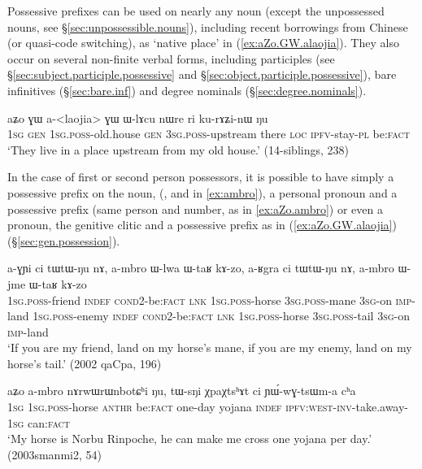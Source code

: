 Possessive prefixes can be used on nearly any noun (except the unpossessed nouns, see §\ref{sec:unpossessible.nouns}), including recent borrowings from Chinese (or quasi-code switching), as   `native place' in (\ref{ex:aZo.GW.alaojia}). They also occur on several non-finite verbal forms, including participles (see §\ref{sec:subject.participle.possessive} and §\ref{sec:object.participle.possessive}), bare infinitives (§\ref{sec:bare.inf}) and degree nominals (§\ref{sec:degree.nominals}).

\begin{exe}
\ex \label{ex:aZo.GW.alaojia}
\gll aʑo ɣɯ a-<laojia> ɣɯ ɯ-lɤcu nɯre ri ku-rɤʑi-nɯ ŋu \\
\textsc{1sg} \textsc{gen} \textsc{1sg}.\textsc{poss}-old.house \textsc{gen} \textsc{3sg}.\textsc{poss}-upstream there \textsc{loc} \textsc{ipfv}-stay-\textsc{pl} be:\textsc{fact} \\
\glt `They live in a place upstream from my old house.' (14-siblings, 238)
\end{exe}

In the case of first or second person possessors, it is possible to have simply a possessive prefix on the noun, (,  and  in \ref{ex:ambro}), a personal pronoun and a possessive prefix (same person and number, as in \ref{ex:aZo.ambro}) or even a pronoun, the genitive clitic  and a possessive prefix as in (\ref{ex:aZo.GW.alaojia}) (§\ref{sec:gen.possession}).

 \begin{exe}
\ex \label{ex:ambro} 
\gll a-ɣɲi ci tɯ\redp{}tɯ-ŋu nɤ, a-mbro ɯ-lwa ɯ-taʁ kɤ-zo, a-ʁgra ci tɯ\redp{}tɯ-ŋu nɤ, a-mbro ɯ-jme ɯ-taʁ kɤ-zo \\
\textsc{1sg}.\textsc{poss}-friend \textsc{indef} \textsc{cond}\redp{}2-be:\textsc{fact} \textsc{lnk} \textsc{1sg}.\textsc{poss}-horse \textsc{3sg}.\textsc{poss}-mane \textsc{3sg}-on \textsc{imp}-land \textsc{1sg}.\textsc{poss}-enemy \textsc{indef} \textsc{cond}\redp{}2-be:\textsc{fact} \textsc{lnk} \textsc{1sg}.\textsc{poss}-horse \textsc{3sg}.\textsc{poss}-tail  \textsc{3sg}-on \textsc{imp}-land  \\
\glt `If you are my friend, land on my horse's mane, if you are my enemy, land on my horse's tail.' (2002 qaCpa, 196)
\end{exe}

\begin{exe}
\ex \label{ex:aZo.ambro}
\gll aʑo a-mbro nɤrwɯrɯnbotɕʰi ŋu, tɯ-sŋi χpaχtsʰɤt ci ɲɯ́-wɣ-tsɯm-a cʰa \\
\textsc{1sg} \textsc{1sg}.\textsc{poss}-horse  \textsc{anthr} be:\textsc{fact} one-day yojana \textsc{indef} \textsc{ipfv}:\textsc{west}-\textsc{inv}-take.away-\textsc{1sg} can:\textsc{fact} \\
\glt `My horse is Norbu Rinpoche, he can make me cross one yojana per day.' (2003smanmi2, 54)
\end{exe}

